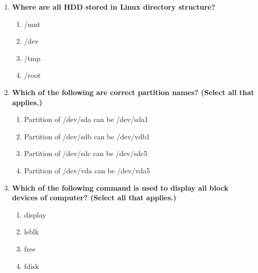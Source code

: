 \begin{flushleft}
\begin{enumerate}
		\item \textbf{Where are all HDD stored in Linux directory structure?}
		\begin{enumerate}[label=(\alph*)]
			\item /mnt
			\item /dev   %
			\item /tmp
			\item /root
		\end{enumerate}
		\bigskip
		\bigskip
		
		
		\item \textbf{Which of the following are correct partition names? (Select all that applies.)}
		\begin{enumerate}[label=(\alph*)]
			\item Partition of /dev/sda can be /dev/sda1     %
			\item Partition of /dev/sdb can be /dev/vdb1
			\item Partition of /dev/sdc can be /dev/sdc5    %
			\item Partition of /dev/vda can be /dev/vda5     %
		\end{enumerate}
		\bigskip
		\bigskip
		
		
		\item \textbf{Which of the following command is used to display all block devices of computer? (Select all that applies.)}
		\begin{enumerate}[label=(\alph*)]
			\item display
			\item lsblk  %
			\item free    
			\item fdisk  %
		\end{enumerate}
		
	
	\end{enumerate}
	
	
\end{flushleft}

\newpage

